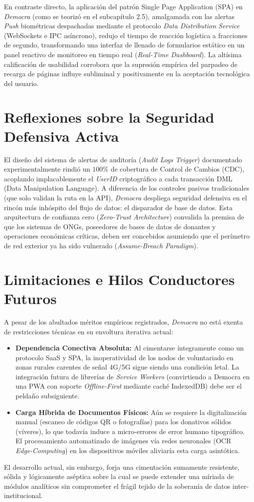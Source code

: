 En contraste directo, la aplicaci\'on del patr\'on Single Page Application (SPA) en \textit{Democra} (como se teoriz\'o en el subcap\'itulo 2.5), amalgamada con las alertas \textit{Push} biom\'etricas despachadas mediante el protocolo \textit{Data Distribution Service} (WebSockets e IPC as\'incrono), redujo el tiempo de reacci\'on log\'istica a fracciones de segundo, transformando una interfaz de llenado de formularios est\'atico en un panel reactivo de monitoreo en tiempo real (\textit{Real-Time Dashboard}). La alt\'isima calificaci\'on de usabilidad corrobora que la supresi\'on emp\'irica del parpadeo de recarga de p\'aginas influye subliminal y positivamente en la aceptaci\'on tecnol\'ogica del usuario.

\section{Reflexiones sobre la Seguridad Defensiva Activa}

El dise\~no del sistema de alertas de auditor\'ia (\textit{Audit Logs Trigger}) documentado experimentalmente rindi\'o un $100\%$ de cobertura de Control de Cambios (CDC), acoplando implacablemente el \textit{UserID} criptogr\'afico a cada transacci\'on DML (Data Manipulation Language). A diferencia de los controles pasivos tradicionales (que solo validan la ruta en la API), \textit{Democra} despliega seguridad defensiva en el rinc\'on m\'as inh\'ospito del flujo de datos: el disparador de base de datos. Esta arquitectura de confianza cero (\textit{Zero-Trust Architecture}) convalida la premisa de que los sistemas de ONGs, poseedores de bases de datos de donantes y operaciones econ\'omicas cr\'iticas, deben ser concebidos asumiendo que el per\'imetro de red exterior ya ha sido vulnerado (\textit{Assume-Breach Paradigm}).

\section{Limitaciones e Hilos Conductores Futuros}

A pesar de los abultados m\'eritos emp\'iricos registrados, \textit{Democra} no est\'a exenta de restricciones t\'ecnicas en su envoltura iterativa actual:
\begin{itemize}
    \item \textbf{Dependencia Conectiva Absoluta:} Al cimentarse \'integramente como un protocolo SaaS y SPA, la inoperatividad de los nodos de voluntariado en zonas rurales carentes de se\~nal 4G/5G sigue siendo una condici\'on letal. La integraci\'on futura de librer\'ias de \textit{Service Workers} (convirtiendo a Democra en una PWA con soporte \textit{Offline-First} mediante cach\'e IndexedDB) debe ser el pelda\~no subsiguiente.
    \item \textbf{Carga H\'ibrida de Documentos F\'isicos:} A\'un se requiere la digitalizaci\'on manual (escaneo de c\'odigos QR o fotograf\'ias) para los donativos s\'olidos (v\'iveres), lo que todav\'ia induce a micro-errores de error humano tipogr\'afico. El procesamiento automatizado de im\'agenes v\'ia redes neuronales (OCR \textit{Edge-Computing}) en los dispositivos m\'oviles aliviar\'ia esta carga asint\'otica.
\end{itemize}

El desarrollo actual, sin embargo, forja una cimentaci\'on sumamente resistente, s\'olida y l\'ogicamente as\'eptica sobre la cual se puede extender una m\'iriada de m\'odulos anal\'iticos sin comprometer el fr\'agil tejido de la soberan\'ia de datos inter-institucional.
